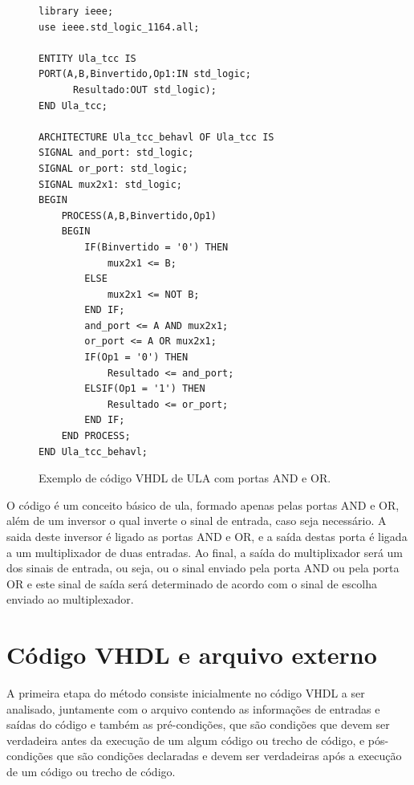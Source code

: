 \begin{figure}[H]
\caption{\label{fig:code_exemplo} Exemplo de código VHDL de ULA com portas AND e OR.}
	\begin{center}
    \begin{minipage}{0.7\textwidth}
    \begin{lstlisting}       
library ieee;
use ieee.std_logic_1164.all;

ENTITY Ula_tcc IS
PORT(A,B,Binvertido,Op1:IN std_logic;
	  Resultado:OUT std_logic);
END Ula_tcc;

ARCHITECTURE Ula_tcc_behavl OF Ula_tcc IS
SIGNAL and_port: std_logic;
SIGNAL or_port: std_logic;
SIGNAL mux2x1: std_logic;
BEGIN
	PROCESS(A,B,Binvertido,Op1)
	BEGIN
		IF(Binvertido = '0') THEN
			mux2x1 <= B;
		ELSE
			mux2x1 <= NOT B;
		END IF;
		and_port <= A AND mux2x1;
		or_port <= A OR mux2x1;
		IF(Op1 = '0') THEN
			Resultado <= and_port;
		ELSIF(Op1 = '1') THEN
			Resultado <= or_port;
		END IF;
	END PROCESS;
END Ula_tcc_behavl;
    \end{lstlisting}
    \end{minipage}
	\end{center}
\end{figure}

O código é um conceito básico de ula, formado apenas pelas portas AND e OR, além de um inversor o qual inverte o sinal de entrada, caso seja necessário. A saida deste inversor é ligado as portas AND e OR, e a saída destas porta é ligada a um multiplixador de duas entradas. Ao final, a saída do multiplixador será um dos sinais de entrada, ou seja, ou o sinal enviado pela porta AND ou pela porta OR e este sinal de saída será determinado de acordo com o sinal de escolha enviado ao multiplexador.

\section{Código VHDL e arquivo externo}
\label{cap:vhdl_assertivas}

A primeira etapa do método consiste inicialmente no código VHDL a ser analisado, juntamente com o arquivo contendo as informações de entradas e saídas do código e também as pré-condições, que são condições que devem ser verdadeira antes da execução de um algum código ou trecho de código, e pós-condições que são condições declaradas e devem ser verdadeiras após a execução de um código ou trecho de código.

